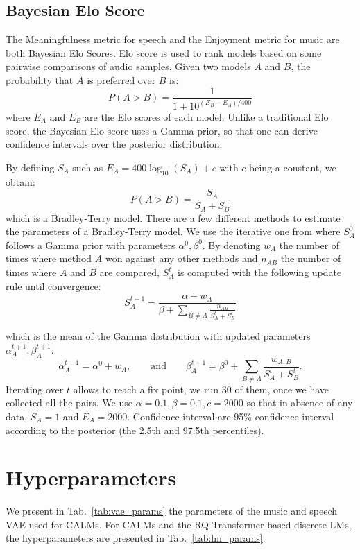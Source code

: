 \subsection{Bayesian Elo Score}
The Meaningfulness metric for speech and the Enjoyment metric for music are both Bayesian Elo Scores. Elo score is used to rank models based on some pairwise comparisons of audio samples. Given two models $A$ and $B$, the probability that $A$ is preferred over $B$ is:
\begin{equation}
    P(A>B) = \frac{1}{1 +10^{(E_B-E_A)/400}}
    \label{eq:elo}
\end{equation}
where $E_A$ and $E_B$ are the Elo scores of each model. Unlike a traditional Elo score, the Bayesian Elo score uses a Gamma prior,
so that one can derive confidence intervals over the posterior distribution.


By defining $S_A$ such as $E_A=400\log_{10}(S_A) + c$ with $c$ being a constant, we obtain:
\begin{equation}
    P(A>B) = \frac{S_A}{S_A+S_B}
\end{equation}
which is a Bradley-Terry \citep{bradley_terry} model. There are a few different methods to estimate the parameters of a Bradley-Terry model. We use the iterative one from \citep{carondoucet} where $S_A^0$ follows a Gamma prior with parameters $\alpha^0, \beta^0$. By denoting $w_A$ the number of times where method $A$ won against any other methods and $n_{AB}$ the number of times where $A$ and $B$ are compared, $S_A^t$ is computed with the following update rule until convergence:
\begin{equation}
    S_A^{t+1} = \frac{\alpha +w_A}{\beta +\sum_{B \neq A}\frac{n_{AB}}{S_A^t+S_B^t}}
\end{equation}

which is the mean of the Gamma distribution with updated parameters $\alpha_A^{t+1},\beta_A^{t+1}$:
\begin{equation}
    \alpha_A^{t+1} = \alpha^0 + w_A,\qquad
    \text{and}\qquad \beta_A^{t+1} = 
    \beta^0 + \sum_{B\neq A} \frac{w_{A,B}}{S_A^t + S_B^t}.
\end{equation}
Iterating over $t$ allows to reach a fix point, we run 30 of them,
once we have collected all the pairs.
We use $\alpha=0.1, \beta=0.1, c=2000$ so that in absence of any data, $S_A=1$ and $E_A = 2000$. Confidence interval are 95\% confidence interval according to the posterior (the 2.5th and 97.5th percentiles).

\section{Hyperparameters}
\label{sec:appendix_hyperarameters}
We present in Tab.~\ref{tab:vae_params} the parameters of the music and speech VAE used for CALMs. For CALMs and the RQ-Transformer based discrete LMs, the hyperparameters are presented in Tab.~\ref{tab:lm_params}.


